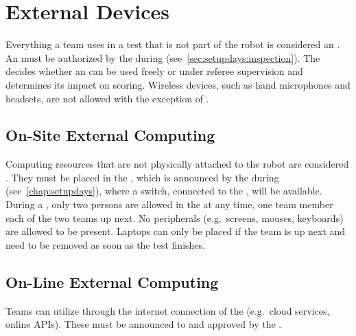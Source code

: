 %
%
\section{External Devices}
\label{sec:rules:externaldevices}
Everything a team uses in a test that is not part of the robot is considered an \ExternalDevice{}.
An \ExternalDevice{} must be authorized by the \TC{} during \RobotInspection{} (see~\ref{sec:setupdays:inspection}).
The  decides whether an \ExternalDevice{} can be used freely or under referee supervision and determines its impact on scoring.
Wireless devices, such as hand microphones and headsets, are not allowed with the exception of \ExternalComputing{}. 

\subsection{On-Site External Computing}
Computing resources that are not physically attached to the robot are considered \ExternalComputing{}.
They must be placed in the \ECRA{}, which is announced by the \TC{} during \SetupDays{} (see~\ref{chap:setupdays}), where a switch, connected to the \ArenaNetwork{} 
, will be available.
During a \Testblock{} 
, only two persons are allowed in the  at any time, one team member each of the two teams up next. No peripherals (e.g.~screens, mouses, keyboards) are allowed to be present. Laptops can only be placed if the team is up next and need to be removed as soon as the test finishes.


\subsection{On-Line External Computing}
\label{sec:rules:onlineexternalcomputing}
Teams can utilize \ExternalComputing{} through the internet connection of the \ArenaNetwork{} (e.g.~cloud services, online APIs). These must be announced to and approved by the \TC{}.

